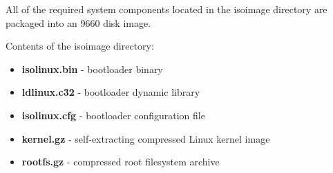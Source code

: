 All of the required system components located in the isoimage directory are packaged into an  9660 disk image.

\noindent
Contents of the isoimage directory:

\begin{itemize}
    \item \textbf{isolinux.bin} - bootloader binary
    \item \textbf{ldlinux.c32} - bootloader dynamic library
    \item \textbf{isolinux.cfg} - bootloader configuration file
    \item \textbf{kernel.gz} - self-extracting compressed Linux kernel image
    \item \textbf{rootfs.gz} - compressed root filesystem archive 
\end{itemize}
